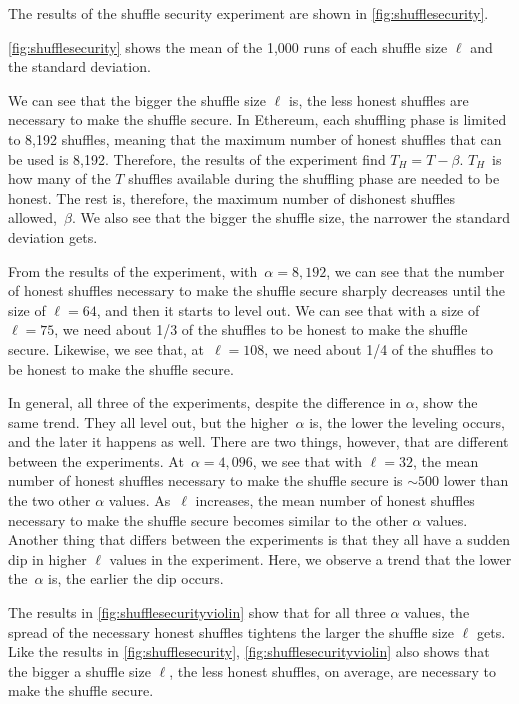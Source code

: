 The results of the shuffle security experiment are shown in \autoref{fig:shufflesecurity}.

\autoref{fig:shufflesecurity} shows the mean of the 1,000 runs of each shuffle size $\ell$ and the standard deviation.

We can see that the bigger the shuffle size $\ell$ is, the less honest shuffles are necessary to make the shuffle secure.
In Ethereum, each shuffling phase is limited to 8,192 shuffles, meaning that the maximum number of honest shuffles that can be used is 8,192.
Therefore, the results of the experiment find $T_H=T-\beta$.
$T_H$~is how many of the $T$ shuffles available during the shuffling phase are needed to be honest.
The rest is, therefore, the maximum number of dishonest shuffles allowed,~$\beta$.
We also see that the bigger the shuffle size, the narrower the standard deviation gets.

From the results of the experiment, with~$\alpha=8,192$, we can see that the number of honest shuffles necessary to make the shuffle secure sharply decreases until the size of $\ell=64$, and then it starts to level out.
We can see that with a size of $\ell=75$, we need about 1/3 of the shuffles to be honest to make the shuffle secure.
Likewise, we see that, at~$\ell=108$, we need about 1/4 of the shuffles to be honest to make the shuffle secure.

In general, all three of the experiments, despite the difference in $\alpha$, show the same trend.
They all level out, but the higher~$\alpha$ is, the lower the leveling occurs, and the later it happens as well.
There are two things, however, that are different between the experiments.
At~$\alpha=4,096$, we see that with $\ell=32$, the mean number of honest shuffles necessary to make the shuffle secure is $\sim500$ lower than the two other $\alpha$ values.
As~$\ell$ increases, the mean number of honest shuffles necessary to make the shuffle secure becomes similar to the other $\alpha$ values.
Another thing that differs between the experiments is that they all have a sudden dip in higher $\ell$ values in the experiment.
Here, we observe a trend that the lower the~$\alpha$ is, the earlier the dip occurs.



The results in \autoref{fig:shufflesecurityviolin} show that for all three $\alpha$ values, the spread of the necessary honest shuffles tightens the larger the shuffle size $\ell$ gets.
Like the results in \autoref{fig:shufflesecurity}, \autoref{fig:shufflesecurityviolin} also shows that the bigger a shuffle size $\ell$, the less honest shuffles, on average, are necessary to make the shuffle secure.


